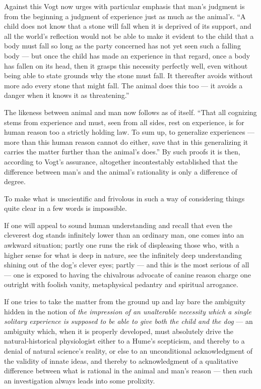 \documentclass[12pt,a4paper]{book}
\begin{document}
Against this Vogt now urges with particular emphasis that man's judgment is from the
beginning a judgment of experience just as much as the animal's. ``A child does not
know that a stone will fall when it is deprived of its support, and all the world's
reflection would not be able to make it evident to the child that a body must fall so
long as the party concerned has not yet seen such a falling body --- but once the child
has made an experience in that regard, once a body has fallen on its head, then it
grasps this necessity perfectly well, even without being able to state grounds why the
stone must fall. It thereafter avoids without more ado every stone that might fall.
The animal does this too --- it avoids a danger when it knows it as threatening.''

The likeness between animal and man now follows as of itself. ``That all cognizing
stems from experience and must, seen from all sides, rest on experience, is for human
reason too a strictly holding law. To sum up, to generalize experiences --- more than
this human reason cannot do either, save that in this generalizing it carries the
matter further than the animal's does.'' By such proofs it is then, according to
Vogt's assurance, altogether incontestably established that the difference between
man's and the animal's rationality is only a difference of degree.

To make what is unscientific and frivolous in such a way of considering things quite
clear in a few words is impossible.

If one will appeal to sound human understanding and recall that even the cleverest dog
stands infinitely lower than an ordinary man, one comes into an awkward situation;
partly one runs the risk of displeasing those who, with a higher sense for what is deep
in nature, see the infinitely deep understanding shining out of the dog's clever eyes;
partly --- and this is the most serious of all --- one is exposed to having the
chivalrous advocate of canine reason charge one outright with foolish vanity,
metaphysical pedantry and spiritual arrogance.

If one tries to take the matter from the ground up and lay bare the ambiguity hidden in
the notion of \emph{the impression of an unalterable necessity which a single solitary
experience is supposed to be able to give both the child and the dog} --- an ambiguity
which, when it is properly developed, must absolutely drive the natural-historical
physiologist either to a Hume's scepticism, and thereby to a denial of natural
science's reality, or else to an unconditional acknowledgment of the validity of innate
ideas, and thereby to acknowledgment of a qualitative difference between what is
rational in the animal and man's reason --- then such an investigation always leads
into some prolixity.
\end{document}
